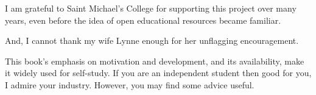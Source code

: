 {I am grateful to Saint Michael's College 
for supporting this project over many years, even before the idea of 
open educational resources became familiar.

And, I cannot thank my wife Lynne enough for her unflagging encouragement.



\newcommand{\classday}[1]{\textsc{#1}}
\newcommand{\colwidth}{1.25in}

\medskip
%
This book's emphasis on motivation and development,
and its availability, make it widely used for self-study.
If you are an independent student then good for you, I admire your industry.
However, you may find some advice useful.

}
